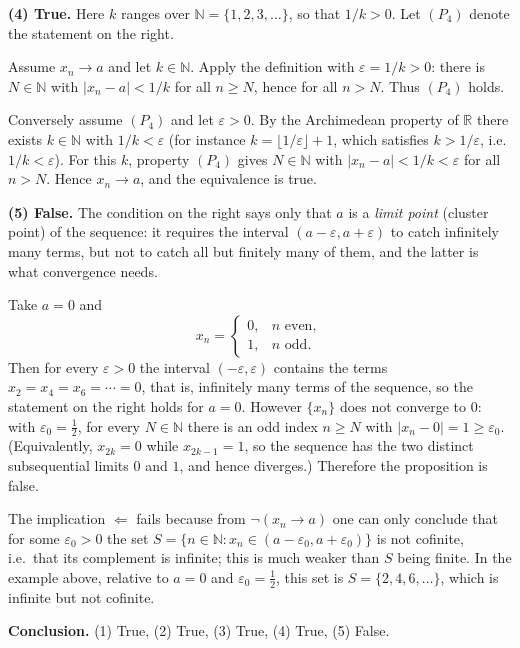 \documentclass[11pt,a4paper]{article}
\newenvironment{solution}[1]{%
  \par\addvspace{1.7ex}%
  \noindent{\color{solutioncolor}\textbf{#1}}\hspace{0.55em}\ignorespaces}%
  {\par\addvspace{0.9ex}}
\begin{document}
\begin{solution}{Solution 2.1.1}
\medskip
\noindent\textbf{(4) True.}
Here $k$ ranges over $\mathbb{N}=\{1,2,3,\dots\}$, so that $1/k>0$. Let $(P_4)$
denote the statement on the right.

Assume $x_n\to a$ and let $k\in\mathbb{N}$. Apply the definition with
$\varepsilon=1/k>0$: there is $N\in\mathbb{N}$ with
$|x_n-a|<1/k$ for all $n\ge N$, hence for all $n>N$. Thus $(P_4)$ holds.

Conversely assume $(P_4)$ and let $\varepsilon>0$. By the Archimedean property of
$\mathbb{R}$ there exists $k\in\mathbb{N}$ with $1/k<\varepsilon$ (for instance
$k=\lfloor 1/\varepsilon\rfloor+1$, which satisfies $k>1/\varepsilon$, i.e.
$1/k<\varepsilon$). For this $k$, property $(P_4)$ gives $N\in\mathbb{N}$ with
$|x_n-a|<1/k<\varepsilon$ for all $n>N$. Hence $x_n\to a$, and the equivalence is
true.

\medskip
\noindent\textbf{(5) False.}
The condition on the right says only that $a$ is a \emph{limit point} (cluster
point) of the sequence: it requires the interval $(a-\varepsilon,a+\varepsilon)$
to catch infinitely many terms, but not to catch all but finitely many of them,
and the latter is what convergence needs.

Take $a=0$ and
\[
  x_n=\begin{cases}0, & n \text{ even},\\[2pt] 1, & n \text{ odd}.\end{cases}
\]
Then for every $\varepsilon>0$ the interval $(-\varepsilon,\varepsilon)$ contains
the terms $x_2=x_4=x_6=\cdots=0$, that is, infinitely many terms of the
sequence, so the statement on the right holds for $a=0$. However $\{x_n\}$ does
not converge to $0$: with $\varepsilon_0=\tfrac12$, for every $N\in\mathbb{N}$
there is an odd index $n\ge N$ with $|x_n-0|=1\ge\varepsilon_0$. (Equivalently,
$x_{2k}=0$ while $x_{2k-1}=1$, so the sequence has the two distinct subsequential
limits $0$ and $1$, and hence diverges.) Therefore the proposition is false.

The implication $\Leftarrow$ fails because from $\lnot(x_n\to a)$ one can only
conclude that for some $\varepsilon_0>0$ the set
$S=\{n\in\mathbb{N}:x_n\in(a-\varepsilon_0,a+\varepsilon_0)\}$ is not cofinite,
i.e.\ that its complement is infinite; this is much weaker than $S$ being
finite. In the example above, relative to $a=0$ and $\varepsilon_0=\tfrac12$,
this set is $S=\{2,4,6,\dots\}$, which is infinite but not cofinite.

\medskip
\noindent\textbf{Conclusion.} (1) True, (2) True, (3) True, (4) True,
(5) False.
\end{solution}
\end{document}
